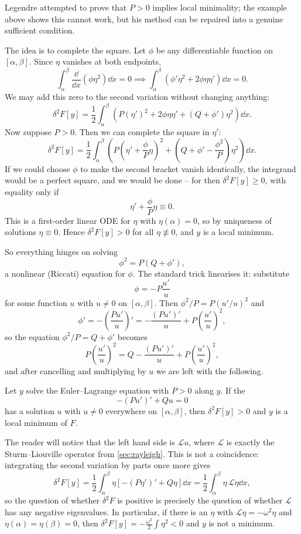 Legendre attempted to prove that $P > 0$ implies local minimality; the example above shows this cannot work, but his method can be repaired into a genuine sufficient condition.

The idea is to complete the square. Let $\phi$ be any differentiable function on $[\alpha, \beta]$. Since $\eta$ vanishes at both endpoints,
$$
\int_\alpha^\beta\frac{\dd}{\dd x}\left(\phi\eta^2\right)\dd x = 0 \implies \int_\alpha^\beta \left(\phi'\eta^2 + 2\phi\eta\eta'\right)\dd x = 0.
$$
We may add this zero to the second variation without changing anything:
$$
\delta^2 F[y] = \frac{1}{2}\int_\alpha^\beta\left(P(\eta')^2 + 2\phi\eta\eta' + (Q + \phi')\eta^2\right)\dd x.
$$
Now suppose $P > 0$. Then we can complete the square in $\eta'$:
$$
\delta^2 F[y] = \frac12\int_\alpha^\beta\left(P\left(\eta' + \frac{\phi}{P}\eta\right)^2 + \left(Q + \phi' - \frac{\phi^2}{P}\right)\eta^2\right)\dd x.
$$
If we could choose $\phi$ to make the second bracket vanish identically, the integrand would be a perfect square, and we would be done -- for then $\delta^2 F[y] \geq 0$, with equality only if
$$
\eta' + \frac{\phi}{P}\eta \equiv 0.
$$
This is a first-order linear ODE for $\eta$ with $\eta(\alpha) = 0$, so by uniqueness of solutions $\eta \equiv 0$. Hence $\delta^2 F[y] > 0$ for all $\eta \not\equiv 0$, and $y$ is a local minimum.

So everything hinges on solving
$$
\phi^2 = P(Q + \phi'),
$$
a nonlinear (Riccati) equation for $\phi$. The standard trick linearises it: substitute
$$
\phi = -P\frac{u'}{u}
$$
for some function $u$ with $u \neq 0$ on $[\alpha, \beta]$. Then $\phi^2/P = P(u'/u)^2$ and
$$
\phi' = -\left(\frac{Pu'}{u}\right)' = -\frac{(Pu')'}{u} + P\left(\frac{u'}{u}\right)^2,
$$
so the equation $\phi^2/P = Q + \phi'$ becomes
$$
P\left(\frac{u'}{u}\right)^2 = Q - \frac{(Pu')'}{u} + P\left(\frac{u'}{u}\right)^2,
$$
and after cancelling and multiplying by $u$ we are left with the following.

\begin{theorem}
	Let $y$ solve the Euler--Lagrange equation with $P > 0$ along $y$. If the 
	$$
	-\left(Pu'\right)' + Qu = 0
	$$
	has a solution $u$ with $u \neq 0$ everywhere on $[\alpha, \beta]$, then $\delta^2 F[y] > 0$ and $y$ is a local minimum of $F$.
\end{theorem}

The reader will notice that the left hand side is $\mathcal{L}u$, where $\mathcal{L}$ is exactly the Sturm--Liouville operator from \autoref{sec:rayleigh}. This is not a coincidence: integrating the second variation by parts once more gives
$$
\delta^2 F[y] = \frac{1}{2}\int_\alpha^\beta \eta\left[-(P\eta')' + Q\eta\right]\dd x = \frac12\int_\alpha^\beta \eta\, \mathcal{L}\eta \dd x,
$$
so the question of whether $\delta^2 F$ is positive is precisely the question of whether $\mathcal{L}$ has any negative eigenvalues. In particular, if there is an $\eta$ with $\mathcal{L}\eta = -\omega^2\eta$ and $\eta(\alpha) = \eta(\beta) = 0$, then $\delta^2 F[y] = -\frac{\omega^2}{2}\int\eta^2 < 0$ and $y$ is not a minimum.

